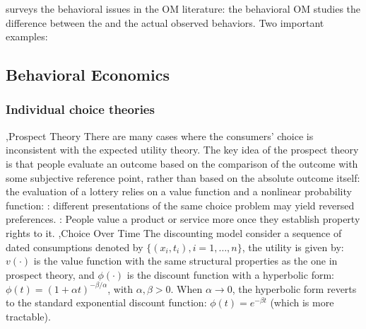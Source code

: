 \documentclass[12pt]{report}
\begin{document}
\cite{Donohue2020} surveys the behavioral issues in the OM literature: the behavioral OM studies the difference between the  and the actual observed behaviors. 
Two important examples: 

\subsection{Behavioral Economics}

\subsubsection{Individual choice theories}
\sep{Prospect Theory} 
There are many cases where the consumers' choice is inconsistent with the expected utility theory. The key idea of the prospect 
theory is that people evaluate an outcome based on the comparison of the outcome with some subjective reference point, rather than based on the absolute outcome itself: 
the evaluation of a lottery relies on a value function and a nonlinear probability function:
: different presentations of the same choice problem may yield reversed preferences. : 
People value a product or service more once they establish property rights to it. 
\sep{Choice Over Time}
The  discounting model consider a sequence of dated consumptions denoted by $\{(x_i,t_i),i=1,\ldots,n\}$, the utility is given by:
$v(\cdot)$ is the value function with the same structural properties as the one in prospect theory, and $\phi(\cdot)$ is the discount function with a hyperbolic form: 
$\phi(t)=(1+\alpha t)^{-\beta/\alpha}$, with $\alpha,\beta>0$. When $\alpha\to 0$, the hyperbolic form reverts to the standard exponential discount function: 
$\phi(t)=e^{-\beta t}$ (which is more tractable).
\end{document}
